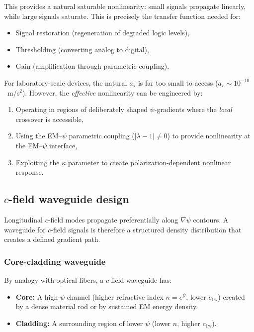 \documentclass[aps,prd,twocolumn,superscriptaddress,nofootinbib,floatfix]{revtex4-2}
\newcommand{\psifield}{\psi}
\newcommand{\cfield}{c_{\text{1w}}}
\begin{document}
This provides a natural saturable nonlinearity: small signals
propagate linearly, while large signals saturate. This is precisely
the transfer function needed for:
\begin{itemize}
\item Signal restoration (regeneration of degraded logic levels),
\item Thresholding (converting analog to digital),
\item Gain (amplification through parametric coupling).
\end{itemize}

For laboratory-scale devices, the natural $a_\star$ is far too
small to access ($a_\star \sim 10^{-10}$~m/s$^2$). However, the
\emph{effective} nonlinearity can be engineered by:
\begin{enumerate}
\item Operating in regions of deliberately shaped
$\psifield$-gradients where the \emph{local} crossover is
accessible,
\item Using the EM--$\psifield$ parametric coupling
($|\lambda-1| \neq 0$) to provide nonlinearity at the
EM--$\psifield$ interface,
\item Exploiting the $\kappa$ parameter to create
polarization-dependent nonlinear response.
\end{enumerate}

\subsection{$c$-field waveguide design}
\label{subsec:waveguide}

Longitudinal $c$-field modes propagate preferentially along
$\nabla\psifield$ contours. A waveguide for $c$-field signals
is therefore a structured density distribution that creates a
defined gradient path.

\subsubsection{Core-cladding waveguide}

By analogy with optical fibers, a $c$-field waveguide has:
\begin{itemize}
\item \textbf{Core:} A high-$\psifield$ channel (higher refractive
index $n = e^\psifield$, lower $\cfield$) created by a dense
material rod or by sustained EM energy density.

\item \textbf{Cladding:} A surrounding region of lower $\psifield$
(lower $n$, higher $\cfield$).
\end{itemize}
\end{document}
